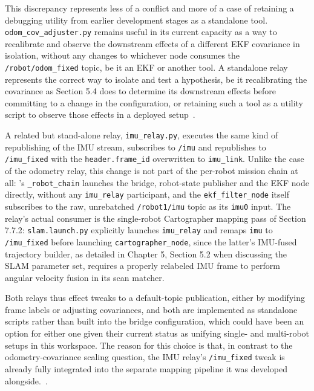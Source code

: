 This discrepancy represents less of a conflict and more of a case of retaining a debugging utility from earlier development stages as a standalone tool. \texttt{odom\_cov\_adjuster.py} remains useful in its current capacity as a way to recalibrate and observe the downstream effects of a different EKF covariance in isolation, without any changes to whichever node consumes the \texttt{/{robot}/odom\_fixed} topic, be it an EKF or another tool. A standalone relay represents the correct way to isolate and test a hypothesis, be it recalibrating the covariance as Section 5.4 does to determine its downstream effects before committing to a change in the configuration, or retaining such a tool as a utility script to observe those effects in a deployed setup~\cite{abaza2025aicovariance}.

A related but stand-alone relay, \texttt{imu\_relay.py}, executes the same kind of republishing of the IMU stream, subscribes to \texttt{/imu} and republishes to \texttt{/imu\_fixed} with the \texttt{header.frame\_id} overwritten to \texttt{imu\_link}. Unlike the case of the odometry relay, this change is not part of the per-robot mission chain at all: 's \texttt{\_robot\_chain} launches the bridge, robot-state publisher and the EKF node directly, without any \texttt{imu\_relay} participant, and the \texttt{ekf\_filter\_node} itself subscribes to the raw, unrebatched \texttt{/robot1/imu} topic as its \texttt{imu0} input. The relay's actual consumer is the single-robot Cartographer mapping pass of Section 7.7.2: \texttt{slam.launch.py} explicitly launches \texttt{imu\_relay} and remaps \texttt{imu} to \texttt{/imu\_fixed} before launching \texttt{cartographer\_node}, since the latter's IMU-fused trajectory builder, as detailed in Chapter 5, Section 5.2 when discussing the SLAM parameter set, requires a properly relabeled IMU frame to perform angular velocity fusion in its scan matcher.

Both relays thus effect tweaks to a default-topic publication, either by modifying frame labels or adjusting covariances, and both are implemented as standalone scripts rather than built into the bridge configuration, which could have been an option for either one given their current status as unifying single- and multi-robot setups in this workspace. The reason for this choice is that, in contrast to the odometry-covariance scaling question, the IMU relay's \texttt{/imu\_fixed} tweak is already fully integrated into the separate mapping pipeline it was developed alongside.~\cite{moore2016generalized}.

